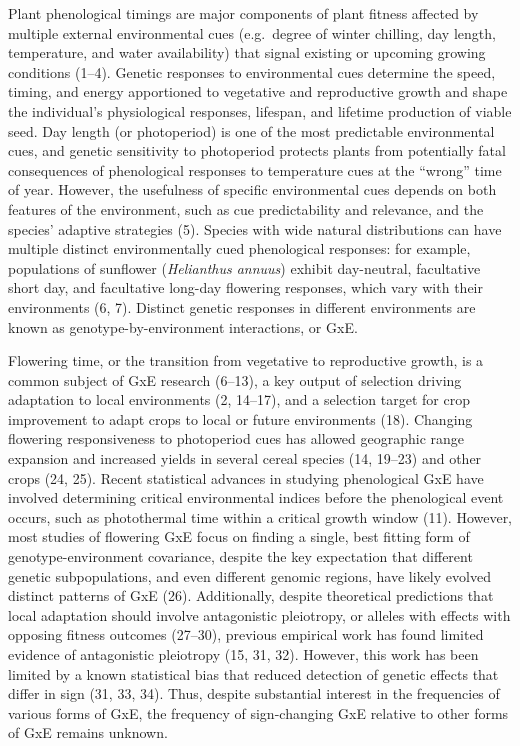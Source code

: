 \documentclass[
  9pt,
  twocolumn,
  twoside]{pnas-new}
\begin{document}
Plant phenological timings are major components of plant fitness
affected by multiple external environmental cues (e.g.~degree of winter
chilling, day length, temperature, and water availability) that signal
existing or upcoming growing conditions (1--4). Genetic responses to
environmental cues determine the speed, timing, and energy apportioned
to vegetative and reproductive growth and shape the individual's
physiological responses, lifespan, and lifetime production of viable
seed. Day length (or photoperiod) is one of the most predictable
environmental cues, and genetic sensitivity to photoperiod protects
plants from potentially fatal consequences of phenological responses to
temperature cues at the ``wrong'' time of year. However, the usefulness
of specific environmental cues depends on both features of the
environment, such as cue predictability and relevance, and the species'
adaptive strategies (5). Species with wide natural distributions can
have multiple distinct environmentally cued phenological responses: for
example, populations of sunflower (\emph{Helianthus annuus}) exhibit
day-neutral, facultative short day, and facultative long-day flowering
responses, which vary with their environments (6, 7). Distinct genetic
responses in different environments are known as genotype-by-environment
interactions, or GxE.

Flowering time, or the transition from vegetative to reproductive
growth, is a common subject of GxE research (6--13), a key output of
selection driving adaptation to local environments (2, 14--17), and a
selection target for crop improvement to adapt crops to local or future
environments (18). Changing flowering responsiveness to photoperiod cues
has allowed geographic range expansion and increased yields in several
cereal species (14, 19--23) and other crops (24, 25). Recent statistical
advances in studying phenological GxE have involved determining critical
environmental indices before the phenological event occurs, such as
photothermal time within a critical growth window (11). However, most
studies of flowering GxE focus on finding a single, best fitting form of
genotype-environment covariance, despite the key expectation that
different genetic subpopulations, and even different genomic regions,
have likely evolved distinct patterns of GxE (26). Additionally, despite
theoretical predictions that local adaptation should involve
antagonistic pleiotropy, or alleles with effects with opposing fitness
outcomes (27--30), previous empirical work has found limited evidence of
antagonistic pleiotropy (15, 31, 32). However, this work has been
limited by a known statistical bias that reduced detection of genetic
effects that differ in sign (31, 33, 34). Thus, despite substantial
interest in the frequencies of various forms of GxE, the frequency of
sign-changing GxE relative to other forms of GxE remains unknown.
\end{document}
